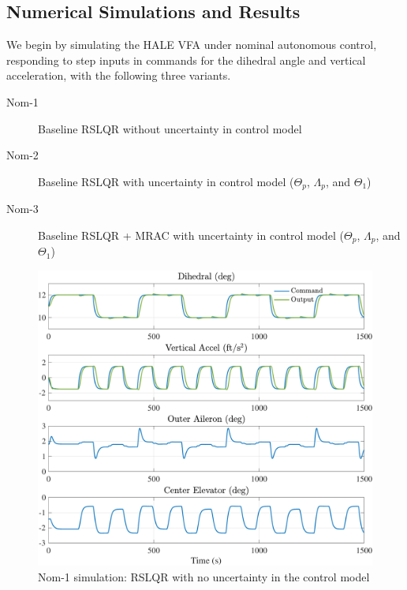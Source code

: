 \documentclass[english]{ifacconf}
\begin{document}
\subsection{Numerical Simulations and Results} \label{subsec:sims}
We begin by simulating the HALE VFA under nominal autonomous control, responding to step inputs in commands for the dihedral angle and vertical acceleration, with the following three variants.
\begin{description}
	\item[Nom-1] Baseline RSLQR without uncertainty in control model
	\item[Nom-2] Baseline RSLQR with uncertainty in control model ($\Theta_p$, $\Lambda_p$, and $\Theta_1$)
	\item[Nom-3] Baseline RSLQR + MRAC with uncertainty in control model ($\Theta_p$, $\Lambda_p$, and $\Theta_1$)
\end{description}

\begin{figure}[htbp]
	\centering
	\includegraphics[width=\columnwidth]{../fig/nom1.pdf}
	\caption{Nom-1 simulation: RSLQR with no uncertainty in the control model}
	\label{fig:nom1}
\end{figure}
\end{document}

